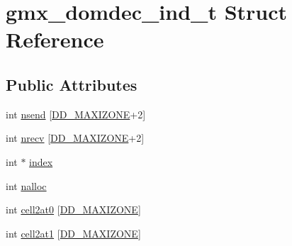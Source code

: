 \hypertarget{structgmx__domdec__ind__t}{\section{gmx\-\_\-domdec\-\_\-ind\-\_\-t \-Struct \-Reference}
\label{structgmx__domdec__ind__t}
}
\subsection*{\-Public \-Attributes}
\begin{DoxyCompactItemize}
\item 
int \hyperlink{structgmx__domdec__ind__t_a93988ceca48d7b6246b39f045796dbf2}{nsend} \mbox{[}\hyperlink{share_2template_2gromacs_2types_2commrec_8h_a9abab5b4994c2ff0d52704a0f0632d31}{\-D\-D\-\_\-\-M\-A\-X\-I\-Z\-O\-N\-E}+2\mbox{]}
\item 
int \hyperlink{structgmx__domdec__ind__t_a83ad371659b7b4286e6136217c7fa6e0}{nrecv} \mbox{[}\hyperlink{share_2template_2gromacs_2types_2commrec_8h_a9abab5b4994c2ff0d52704a0f0632d31}{\-D\-D\-\_\-\-M\-A\-X\-I\-Z\-O\-N\-E}+2\mbox{]}
\item 
int $\ast$ \hyperlink{structgmx__domdec__ind__t_a4b7d44da83952425c31b98ab92616b64}{index}
\item 
int \hyperlink{structgmx__domdec__ind__t_a68a8c621b088059f71a3532e770ad112}{nalloc}
\item 
int \hyperlink{structgmx__domdec__ind__t_a7b6043d38236c0c0e8bab23cd5059e05}{cell2at0} \mbox{[}\hyperlink{share_2template_2gromacs_2types_2commrec_8h_a9abab5b4994c2ff0d52704a0f0632d31}{\-D\-D\-\_\-\-M\-A\-X\-I\-Z\-O\-N\-E}\mbox{]}
\item 
int \hyperlink{structgmx__domdec__ind__t_aeca5a0667a65d68970791dcd648889bc}{cell2at1} \mbox{[}\hyperlink{share_2template_2gromacs_2types_2commrec_8h_a9abab5b4994c2ff0d52704a0f0632d31}{\-D\-D\-\_\-\-M\-A\-X\-I\-Z\-O\-N\-E}\mbox{]}
\end{DoxyCompactItemize}


